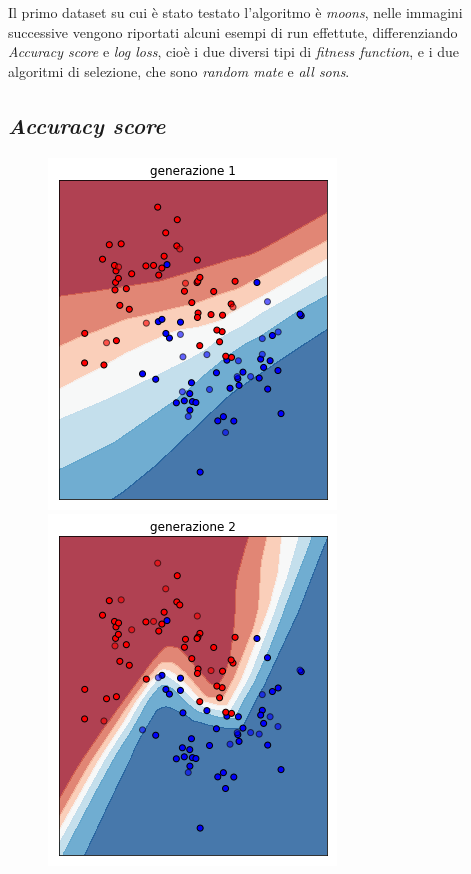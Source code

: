 \documentclass[12pt,a4paper]{report}
\begin{document}
Il primo dataset su cui è stato testato l'algoritmo è \textit{moons}, nelle immagini successive vengono riportati alcuni esempi di run effettute, differenziando \textit{Accuracy score} e \textit{log loss}, cioè i due diversi tipi di \textit{fitness function}, e i due algoritmi di selezione, che sono \textit{random mate} e \textit{all sons}.
 
\subsection{\textit{Accuracy score}}

\begin{figure}[H]
 \centering
 \includegraphics[scale = 0.3]{images/moons-rnd-acc./1}
 \includegraphics[scale = 0.3]{images/moons-rnd-acc./2}

\end{figure}
\end{document}
